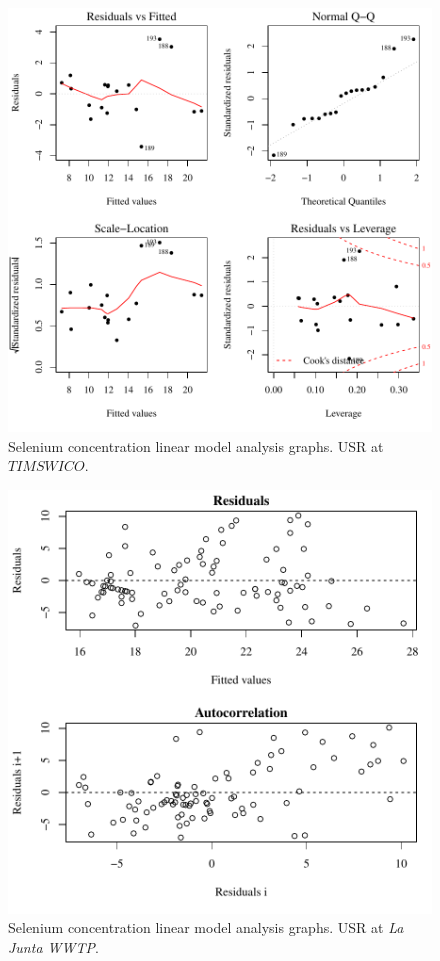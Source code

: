 \begin{figure}[htbp]
	\begin{center}
	\includegraphics[width=6in]{"Figures/Results_USR/Conc Model lm-fit TIM"}
	\caption{Selenium concentration linear model analysis graphs.  USR at $TIMSWICO$.}
	\end{center}
\end{figure}
\newpage

\begin{figure}[htbp]
	\begin{center}
	\includegraphics[width=6in]{"Figures/Results_USR/Conc Model lm-fit WTP"}
	\caption{Selenium concentration linear model analysis graphs.  USR at \textit{La Junta WWTP}.}
	\end{center}
\end{figure}
\newpage

